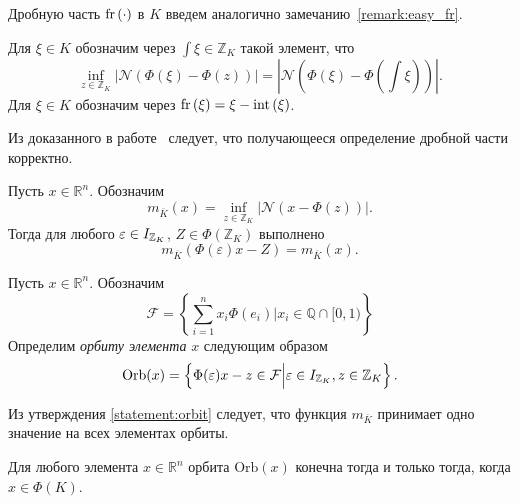 \documentclass[_00_autoref.tex]{subfiles}
\begin{document}
Дробную часть $\textrm{fr}\left(\cdot\right)$ в $K$ введем аналогично замечанию~\ref{remark:easy_fr}.

\begin{definition}
    Для $\xi \in K$ обозначим через $\int{\xi} \in \mathbb{Z}_K$ такой элемент, что
    \begin{equation*}
        \inf\limits_{z\in\mathbb{Z}_K} |\mathcal{N}(\Phi(\xi) - \Phi(z))| = |\mathcal{N}(\Phi(\xi) - \Phi(\int{\xi}))|.
    \end{equation*}
    Для $\xi \in K$ обозначим через $\textrm{fr}\left(\xi\right) = \xi - \textrm{int}\left(\xi\right)$.
\end{definition}

Из доказанного в работе~\cite{source:Lezowski} следует, что получающееся определение дробной части корректно.

\begin{statement}\label{statement:orbit}
    Пусть $x \in \mathbb{R}^n$.
    Обозначим
    \begin{equation*}
        m_{\overline{K}}(x) = \inf_{z\in\mathbb{Z}_K} |\mathcal{N}(x - \Phi(z))|.
    \end{equation*}
    Тогда для любого $\varepsilon \in I_{\mathbb{Z}_K}$, $Z \in \Phi(\mathbb{Z}_K)$ выполнено
    \begin{equation*}
        m_{\overline{K}}(\Phi(\varepsilon)x - Z) = m_{\overline{K}}(x).
    \end{equation*}
\end{statement}

\begin{definition}
    Пусть $x\in \mathbb{R}^n$.
    Обозначим
    \begin{equation*}
        \mathcal{F} = \left\{
            \sum\limits_{i=1}^n x_i\Phi(e_i) \Big| x_i \in \mathbb{Q}\cap[0, 1)
        \right\}
    \end{equation*}
    Определим \emph{орбиту элемента} $x$ следующим образом 
    \begin{equation*}
        \textrm{Orb}(x) = \left\{
        \Phi(\varepsilon)x - z \in \mathcal{F} \Big| \varepsilon \in I_{\mathbb{Z}_K}, z \in \mathbb{Z}_K
    \right\}.
    \end{equation*}
\end{definition}

Из утверждения \ref{statement:orbit} следует, что функция $m_{\overline{K}}$ принимает одно значение на всех элементах орбиты.

\begin{statement}
    Для любого элемента $x\in \mathbb{R}^n$ орбита $\textrm{Orb}(x)$ конечна тогда и только тогда, когда $x \in \Phi(K)$.
\end{statement}
\end{document}
